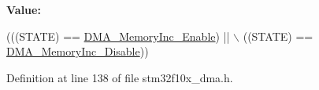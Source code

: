 {\bfseries Value\+:}
\begin{DoxyCode}
(((STATE) == \hyperlink{group___d_m_a__memory__incremented__mode_ga4e8cb23d039c74bbbf365d7678835bbb}{DMA\_MemoryInc\_Enable}) || \(\backslash\)
                                        ((STATE) == \hyperlink{group___d_m_a__memory__incremented__mode_ga795a277c997048783a383b026f19a5ab}{DMA\_MemoryInc\_Disable}))
\end{DoxyCode}


Definition at line 138 of file stm32f10x\+\_\+dma.\+h.

